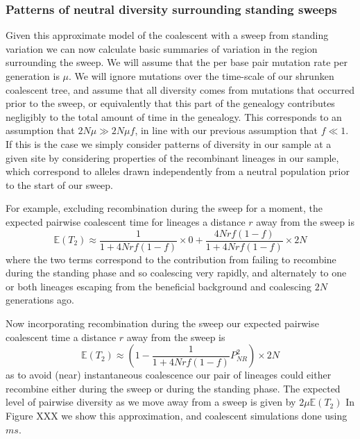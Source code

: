 \documentclass[a4paper,10pt]{article}
\begin{document}

\subsubsection{Patterns of neutral diversity surrounding standing sweeps}
Given this approximate model of the coalescent with a sweep from standing variation we can now calculate basic summaries of variation in the region surrounding the sweep. We will assume that the per base pair mutation rate per generation is $\mu$. We will ignore mutations over the time-scale of our shrunken coalescent tree, and assume that all diversity comes from mutations that occurred prior to the sweep, or equivalently that this part of the genealogy contributes negligibly to the total amount of time in the genealogy. This corresponds to an assumption that $2N\mu \gg 2N \mu f$, in line with our previous assumption that $f \ll 1$. If this is the case we simply consider patterns of diversity in our sample at a given site by considering properties of the recombinant lineages in our sample, which correspond to alleles drawn independently from a neutral population prior to the start of our sweep.

For example, excluding recombination during the sweep for a moment, the expected pairwise coalescent time for lineages a distance $r$ away from the sweep is
\begin{equation}
	\mathbb{E}(T_2)\approx \frac{1}{1 + 4Nrf(1-f)} \times 0 + \frac{4Nrf(1-f)}{1 + 4Nrf(1-f)} \times 2N
\end{equation}
where the two terms correspond to the contribution from failing to recombine during the standing phase and so coalescing very rapidly, and alternately to one or both lineages escaping from the beneficial background and coalescing $2N$ generations ago.

Now incorporating recombination during the sweep our expected pairwise coalescent time a distance $r$ away from the sweep is
\begin{equation}
	\mathbb{E}(T_2) \approx \left(1-\frac{1}{1 + 4Nrf(1-f)} P_{NR}^2  \right) \times 2N
\end{equation}
as to avoid (near) instantaneous coalescence our pair of lineages could either recombine either during the sweep or during the standing phase. The expected level of pairwise diversity as we move away from a sweep is given by $2\mu \mathbb{E}(T_2)$
In Figure XXX we show this approximation, and coalescent simulations done using $ms$. 
\end{document}
